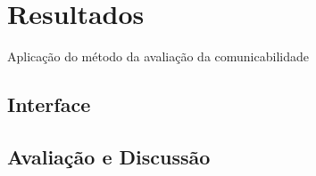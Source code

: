\chapter{Resultados}

Aplicação do método da avaliação da comunicabilidade

\section{Interface}


\section{Avaliação e Discussão}

